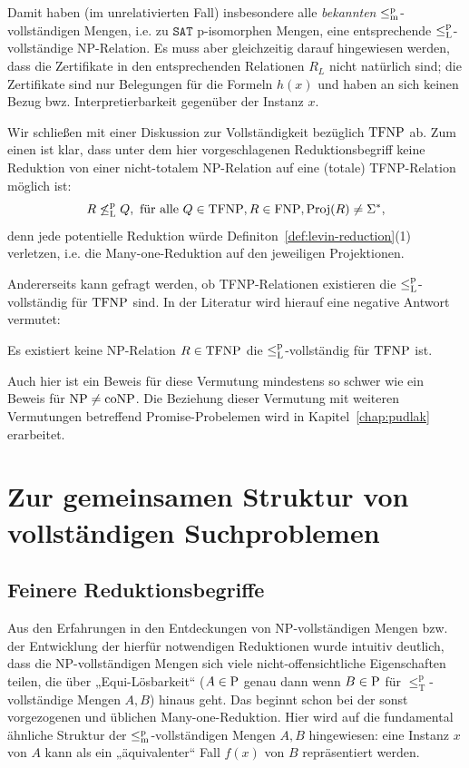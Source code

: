 Damit haben (im unrelativierten Fall) insbesondere alle \emph{bekannten} $\leqmp$-vollständigen Mengen, i.e. zu $\mathtt{SAT}$ p-isomorphen Mengen, eine entsprechende $\leqlp$-vollständige NP-Relation.
Es muss aber gleichzeitig darauf hingewiesen werden, dass die Zertifikate in den entsprechenden Relationen $R_L$ nicht natürlich sind; die Zertifikate sind nur Belegungen für die Formeln $h(x)$ und haben an sich keinen Bezug bwz. Interpretierbarkeit gegenüber der Instanz $x$.

Wir schließen mit einer Diskussion zur Vollständigkeit bezüglich $\TFNP$ ab. Zum einen ist klar, dass unter dem hier vorgeschlagenen Reduktionsbegriff keine Reduktion von einer nicht-totalem NP-Relation auf eine (totale) TFNP-Relation möglich ist: 
\[ R \not\leqlp Q, \text{ für alle } Q\in\TFNP, R\in\FNP, \Proj(R)\neq\Sigma^*, \]
denn jede potentielle Reduktion würde Definiton~\ref{def:levin-reduction}(1) verletzen, i.e. die Many-one-Reduktion auf den jeweiligen Projektionen.

Andererseits kann gefragt werden, ob TFNP-Relationen existieren die $\leqlp$-vollständig für $\TFNP$ sind. In der Literatur \parencite[vgl.][]{pudlak_incompleteness_2017} wird hierauf eine negative Antwort vermutet:
\begin{conjecture}[\hTFNP]
    Es existiert keine NP-Relation $R\in\TFNP$ die $\leqlp$-vollständig für $\TFNP$ ist.
\end{conjecture}
Auch hier ist ein Beweis für diese Vermutung mindestens so schwer wie ein Beweis für $\NP\neq\coNP$. Die Beziehung dieser Vermutung mit weiteren Vermutungen betreffend Promise-Probelemen wird in Kapitel~\ref{chap:pudlak} erarbeitet.

\section{Zur gemeinsamen Struktur von vollständigen Suchproblemen}\label{sec:gemeinsame-struktur}

\subsection*{Feinere Reduktionsbegriffe}

Aus den Erfahrungen in den Entdeckungen von NP-vollständigen Mengen bzw. der Entwicklung der hierfür notwendigen Reduktionen wurde intuitiv deutlich, dass die NP-vollständigen Mengen sich viele nicht-offensichtliche Eigenschaften teilen, die über „Equi-Lösbarkeit“ ($A\in \P$ genau dann wenn $B\in \P$ für $\leq_\mathrm T^\mathrm p$-vollständige Mengen $A,B$) hinaus geht.
%
Das beginnt schon bei der sonst vorgezogenen und üblichen Many-one-Reduktion. Hier wird auf die fundamental ähnliche Struktur der $\leqmp$-vollständigen Mengen $A, B$ hingewiesen: eine Instanz $x$ von $A$ kann als ein „äquivalenter“ Fall $f(x)$ von $B$ repräsentiert werden.

